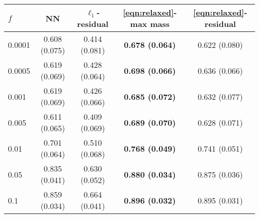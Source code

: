 \begin{tabular}{|l||c|c|c|c|}
\hline
$f$ & NN & $\ell_1$-residual & \eqref{eqn:relaxed}-max mass & \eqref{eqn:relaxed}-residual \\
\hline\hline
0.0001 & 0.608 (0.075) & 0.414 (0.081) & \textbf{0.678 (0.064)} & 0.622 (0.080) \\
\hline
0.0005 & 0.619 (0.069) & 0.428 (0.064) & \textbf{0.698 (0.066)} & 0.636 (0.066) \\
\hline
0.001 & 0.619 (0.069) & 0.426 (0.066) & \textbf{0.685 (0.072)} & 0.632 (0.077) \\
\hline
0.005 & 0.611 (0.065) & 0.409 (0.069) & \textbf{0.689 (0.070)} & 0.628 (0.071) \\
\hline
0.01 & 0.701 (0.064) & 0.510 (0.068) & \textbf{0.768 (0.049)} & 0.741 (0.051) \\
\hline
0.05 & 0.835 (0.041) & 0.630 (0.052) & \textbf{0.880 (0.034)} & 0.875 (0.036) \\
\hline
0.1 & 0.859 (0.034) & 0.664 (0.041) & \textbf{0.896 (0.032)} & 0.895 (0.031) \\
\hline
\end{tabular}